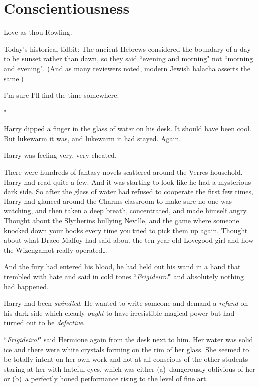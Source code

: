 \chapter{Conscientiousness}

\begin{chapterOpeningAuthorNote}
Love as thou Rowling.

Today's historical tidbit: The ancient Hebrews considered the boundary of a day to be sunset rather than dawn, so they said ``evening and morning" not ``morning and evening". (And as many reviewers noted, modern Jewish halacha asserts the same.)
\end{chapterOpeningAuthorNote}
\begin{chapterOpeningQuote}
I'm sure I'll find the time somewhere.
\end{chapterOpeningQuote}

"

\hplettrineextrapara
Harry dipped a finger in the glass of water on his desk. It should have been cool. But lukewarm it was, and lukewarm it had stayed. Again.

Harry was feeling very, very cheated.

There were hundreds of fantasy novels scattered around the Verres household. Harry had read quite a few. And it was starting to look like he had a mysterious dark side. So after the glass of water had refused to cooperate the first few times, Harry had glanced around the Charms classroom to make sure no-one was watching, and then taken a deep breath, concentrated, and made himself angry. Thought about the Slytherins bullying Neville, and the game where someone knocked down your books every time you tried to pick them up again. Thought about what Draco Malfoy had said about the ten-year-old Lovegood girl and how the Wizengamot really operated{\ldots}

And the fury had entered his blood, he had held out his wand in a hand that trembled with hate and said in cold tones ``\emph{Frigideiro!}" and absolutely nothing had happened.

Harry had been \emph{swindled}. He wanted to write someone and demand a \emph{refund} on his dark side which clearly \emph{ought} to have irresistible magical power but had turned out to be \emph{defective}.

``\emph{Frigideiro!}" said Hermione again from the desk next to him. Her water was solid ice and there were white crystals forming on the rim of her glass. She seemed to be totally intent on her own work and not at all conscious of the other students staring at her with hateful eyes, which was either (a)~dangerously oblivious of her or (b)~a perfectly honed performance rising to the level of fine art.

